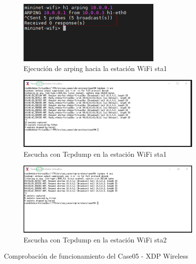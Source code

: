 \begin{figure}[h!]
    \centering
    \begin{subfigure}[b]{\textwidth}
    	\centering
        \includegraphics[width=7cm]{archivos/img/dev/xdp-wifi/case05/demo_case05_1_edited.png}
        \caption{Ejecución de arping hacia la estación WiFi sta1}
        \label{fig:case05_xdp_wifi_func_ping}
    \end{subfigure}
    \par\bigskip
    \begin{subfigure}[b]{\textwidth}
    	\centering
        \includegraphics[width=14cm]{archivos/img/dev/xdp-wifi/case05/demo_case05_2_edited.png}
        \caption{Escucha con Tcpdump en la estación WiFi sta1}
        \label{fig:case05_xdp_wifi_func_list1}
    \end{subfigure}
    \par\bigskip
    \begin{subfigure}[b]{\textwidth}
    	\centering
        \includegraphics[width=14cm]{archivos/img/dev/xdp-wifi/case05/demo_case05_3_edited.png}
        \caption{Escucha con Tcpdump en la estación WiFi sta2}
        \label{fig:case05_xdp_wifi_func_list2}
    \end{subfigure}
    
    \caption{Comprobación de funcionamiento del Case05 - XDP Wireless}
    \label{fig:case05_xdp_wifi_func1}
\end{figure}


